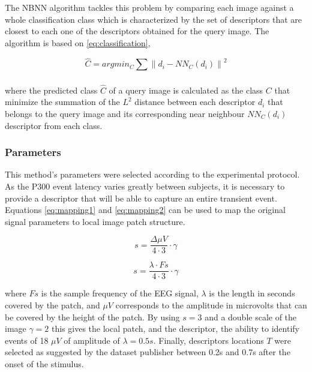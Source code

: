 \documentclass[entropy,article,submit,moreauthors,pdftex,10pt,a4paper]{mdpi}
\begin{document}
The NBNN algorithm tackles this problem by comparing each image against a whole classification class which is characterized by the set of descriptors that are closest to each one of the descriptors obtained for the query image.  The algorithm is based on \ref{eq:classification},

\begin{equation}
\hat{C} = argmin_C \sum_{}^{} \left\lVert d_i - NN_C(d_i) \right\rVert ^2
\label{eq:classification}
\end{equation}

\noindent where the predicted class $\hat{C}$ of a query image is calculated as the class $ C $ that minimize the summation of the $ L^2 $ distance between each descriptor $ d_i $ that belongs to the query image and its corresponding near neighbour $ NN_C(d_i) $ descriptor from each class.


\subsubsection{Parameters}

This method's parameters were selected according to the experimental protocol.  As the P300 event latency varies greatly between subjects, it is necessary to provide a descriptor that will be able to capture an entire transient event.  Equations \ref{eq:mapping1} and \ref{eq:mapping2} can be used to map the original signal parameters to local image patch structure. 

\begin{equation}
s = \frac{\Delta \mu V}{4 \cdot 3} \cdot \gamma 
\label{eq:mapping1}
\end{equation}

\begin{equation}
s = \frac{\lambda \cdot Fs}{4 \cdot 3} \cdot \gamma
\label{eq:mapping2}
\end{equation}

\noindent where $ Fs $ is the sample frequency of the EEG signal, $ \lambda $ is the length in seconds covered by the patch, and $ \mu V $ corresponds to the amplitude in microvolts that can be covered by the height of the patch.   By using $ s = 3 $ and a double scale of the image $ \gamma = 2 $ this gives the local patch, and the descriptor, the ability to identify events of 18 $ \mu V $ of amplitude of $ \lambda = 0.5 s $.  Finally, descriptors locations $ T $ were selected as suggested by the dataset publisher \citep{Riccio2013} between 0.2s and 0.7s after the onset of the stimulus. 
\end{document}
